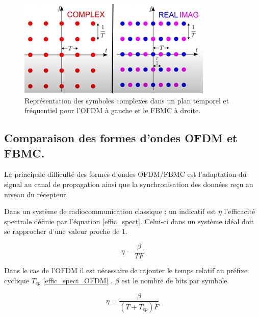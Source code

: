 \documentclass[conference]{IEEEtran}
\begin{document}
 
\begin{figure}[htbp]
\centerline{\includegraphics{OFDM_complex.png}}
\caption{Représentation des symboles complexes dans un plan temporel et fréquentiel pour l'OFDM à gauche et le FBMC à droite.}
\label{OFDMFBMCPlan}
\end{figure}

\subsection{Comparaison des formes d'ondes OFDM et FBMC.}

La principale difficulté des formes d'ondes OFDM/FBMC est l'adaptation du signal au canal de propagation ainsi que la synchronisation des données reçu au niveau du récepteur.

Dans un système de radiocommunication classique : un indicatif est $\eta$ l'efficacité spectrale définie par l'équation \eqref{effic_spect}. Celui-ci dans un système idéal doit se rapprocher d'une valeur proche de $1$.

\begin{equation}
\eta = \frac{\beta}{TF}\label{effic_spect}
\end{equation}

Dans le cas de l'OFDM il est nécessaire de rajouter le temps relatif au préfixe cyclique $T_{cp}$ \eqref{effic_spect_OFDM} . $\beta$ est le nombre de bits par symbole. 


\begin{equation}
\eta = \frac{\beta}{(T+T_{cp})F}\label{effic_spect_OFDM}
\end{equation}
\end{document}
